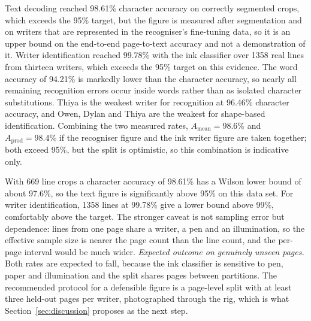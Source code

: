 
            Text decoding reached 98.61\% character accuracy on correctly segmented crops, which exceeds the 95\% target, but the figure is measured after segmentation and on writers that are represented in the recogniser's fine-tuning data, so it is an upper bound on the end-to-end page-to-text accuracy and not a demonstration of it.
            Writer identification reached 99.78\% with the ink classifier over 1358 real lines from thirteen writers, which exceeds the 95\% target on this evidence.
            The word accuracy of 94.21\% is markedly lower than the character accuracy, so nearly all remaining recognition errors occur inside words rather than as isolated character substitutions.
            Thiya is the weakest writer for recognition at 96.46\% character accuracy, and Owen, Dylan and Thiya are the weakest for shape-based identification.
            Combining the two measured rates, $A_{\mathrm{mean}}=98.6\%$ and $A_{\mathrm{prod}}=98.4\%$ if the recogniser figure and the ink writer figure are taken together; both exceed 95\%, but the split is optimistic, so this combination is indicative only.


            With 669 line crops a character accuracy of 98.61\% has a Wilson lower bound of about 97.6\%, so the text figure is significantly above 95\% on this data set.
            For writer identification, 1358 lines at 99.78\% give a lower bound above 99\%, comfortably above the target.
            The stronger caveat is not sampling error but dependence: lines from one page share a writer, a pen and an illumination, so the effective sample size is nearer the page count than the line count, and the per-page interval would be much wider.
            \emph{Expected outcome on genuinely unseen pages.}
            Both rates are expected to fall, because the ink classifier is sensitive to pen, paper and illumination and the split shares pages between partitions.
            The recommended protocol for a defensible figure is a page-level split with at least three held-out pages per writer, photographed through the rig, which is what Section~\ref{sec:discussion} proposes as the next step.



\medskip
\label{sec:res-qtp3}

